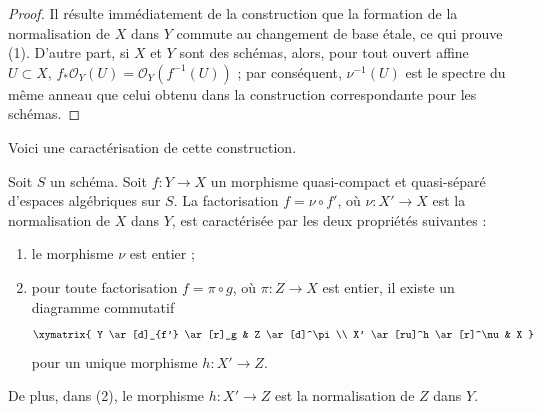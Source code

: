 \begin{proof}
Il résulte immédiatement de la construction que la formation
de la normalisation de $X$ dans $Y$ commute au changement de base
étale, ce qui prouve (1). D'autre part, si
$X$ et $Y$ sont des schémas, alors, pour tout ouvert affine $U \subset X$,
$f_*\mathcal{O}_Y(U) = \mathcal{O}_Y(f^{-1}(U))$ ; par conséquent,
$\nu^{-1}(U)$ est le spectre du même anneau que celui
obtenu dans la construction correspondante pour les schémas.
\end{proof}

\noindent
Voici une caractérisation de cette construction.

\begin{lemma}
\label{lemma-characterize-normalization}
Soit $S$ un schéma. Soit $f : Y \to X$ un morphisme quasi-compact et quasi-séparé
d'espaces algébriques sur $S$. La factorisation $f = \nu \circ f'$,
où $\nu : X' \to X$ est la normalisation de $X$ dans $Y$, est caractérisée
par les deux propriétés suivantes :
\begin{enumerate}
\item le morphisme $\nu$ est entier ;
\item pour toute factorisation $f = \pi \circ g$, où $\pi : Z \to X$
est entier, il existe un diagramme commutatif
$$
\xymatrix{
Y \ar[d]_{f'} \ar[r]_g & Z \ar[d]^\pi \\
X' \ar[ru]^h \ar[r]^\nu & X
}
$$
pour un unique morphisme $h : X' \to Z$.
\end{enumerate}
De plus, dans (2), le morphisme $h : X' \to Z$ est la normalisation de
$Z$ dans $Y$.
\end{lemma}

